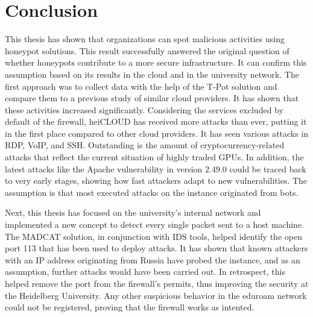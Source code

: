 \chapter{Conclusion}

This thesis has shown that organizations can spot malicious activities using honeypot solutions.
This result successfully answered the original question of whether honeypots contribute to a more secure infrastructure.
It can confirm this assumption based on its results in the cloud and in the university network.
The first approach was to collect data with the help of the T-Pot solution and compare them to a previous study of similar cloud providers.
It has shown that these activities increased significantly.
Considering the services excluded by default of the firewall, heiCLOUD has received more attacks than ever, putting it in the first place compared to other cloud providers.
It has seen various attacks in RDP, VoIP, and SSH.
Outstanding is the amount of cryptocurrency-related attacks that reflect the current situation of highly traded GPUs.
In addition, the latest attacks like the Apache vulnerability in version $2.49.0$ could be traced back to very early stages, showing how fast attackers adapt to new vulnerabilities.
The assumption is that most executed attacks on the instance originated from bots.

Next, this thesis has focused on the university's internal network and implemented a new concept to detect every single packet sent to a host machine.
The MADCAT solution, in conjunction with IDS tools, helped identify the open port 113 that has been used to deploy attacks.
It has shown that known attackers with an IP address originating from Russia have probed the instance, and as an assumption, further attacks would have been carried out.
In retrospect, this helped remove the port from the firewall's permits, thus improving the security at the Heidelberg University.
Any other suspicious behavior in the eduroam network could not be registered, proving that the firewall works as intented.

